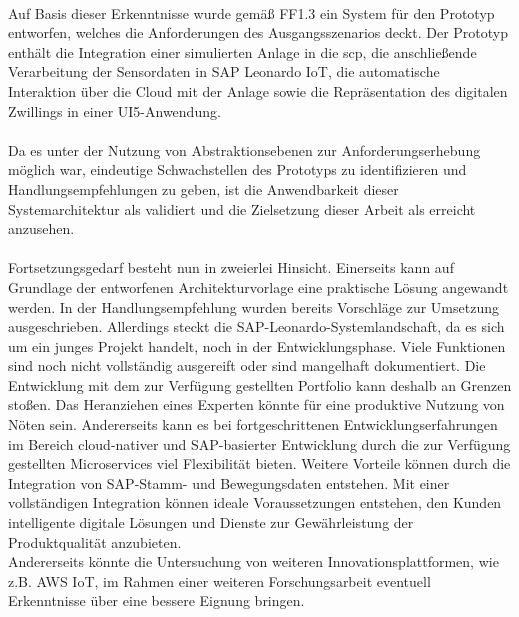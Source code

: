 \\ Auf Basis dieser Erkenntnisse wurde gemäß FF1.3 ein System für den Prototyp entworfen, welches die Anforderungen des Ausgangsszenarios deckt. Der Prototyp enthält die Integration einer simulierten Anlage in die \ac{scp}, die anschließende Verarbeitung der Sensordaten in SAP Leonardo IoT, die automatische Interaktion über die Cloud mit der Anlage sowie die Repräsentation des digitalen Zwillings in einer UI5-Anwendung. 
\\\\%
Da es unter der Nutzung von Abstraktionsebenen zur Anforderungserhebung möglich war, eindeutige Schwachstellen des Prototyps zu identifizieren und Handlungsempfehlungen zu geben, ist die Anwendbarkeit dieser Systemarchitektur als validiert und die Zielsetzung dieser Arbeit als erreicht anzusehen. 
\\\\ Fortsetzungsgedarf besteht nun in zweierlei Hinsicht. Einerseits kann auf Grundlage der entworfenen Architekturvorlage eine praktische Lösung angewandt werden. In der Handlungsempfehlung wurden bereits Vorschläge zur Umsetzung ausgeschrieben. Allerdings steckt die SAP-Leonardo-Systemlandschaft, da es sich um ein junges Projekt handelt, noch in der Entwicklungsphase. Viele Funktionen sind noch nicht vollständig ausgereift oder sind mangelhaft dokumentiert. Die Entwicklung mit dem zur Verfügung gestellten Portfolio kann deshalb an Grenzen stoßen. Das Heranziehen eines Experten könnte für eine produktive Nutzung von Nöten sein. Andererseits kann es bei fortgeschrittenen Entwicklungserfahrungen im Bereich cloud-nativer und SAP-basierter Entwicklung durch die zur Verfügung gestellten Microservices viel Flexibilität bieten.  Weitere Vorteile können durch die  Integration von SAP-Stamm- und Bewegungsdaten entstehen. Mit einer vollständigen Integration können ideale Voraussetzungen entstehen, den Kunden intelligente digitale Lösungen und Dienste zur Gewährleistung der Produktqualität anzubieten. 
\\Andererseits könnte die Untersuchung von weiteren Innovationsplattformen, wie z.B. AWS IoT, im Rahmen einer weiteren Forschungsarbeit eventuell Erkenntnisse über eine bessere Eignung bringen. 
\newpage
